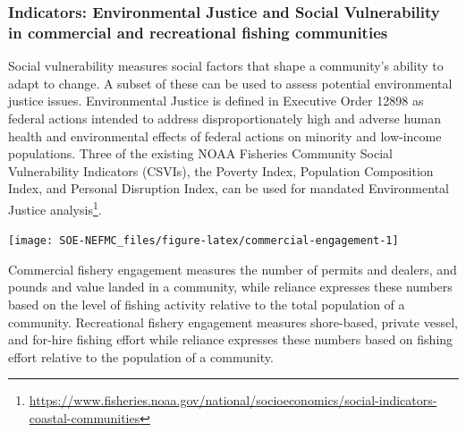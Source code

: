 \documentclass[
  10pt,
]{article}
\let\origfigure\figure
\let\endorigfigure\endfigure
\renewenvironment{figure}[1][2] {
    \expandafter\origfigure\expandafter[H]
} {
    \endorigfigure
}
\begin{document}
\hypertarget{indicators-environmental-justice-and-social-vulnerability-in-commercial-and-recreational-fishing-communities}{%
\subsubsection{Indicators: Environmental Justice and Social Vulnerability in commercial and recreational fishing communities}\label{indicators-environmental-justice-and-social-vulnerability-in-commercial-and-recreational-fishing-communities}}

Social vulnerability measures social factors that shape a community's ability to adapt to change. A subset of these can be used to assess potential environmental justice issues. Environmental Justice is defined in Executive Order 12898 as federal actions intended to address disproportionately high and adverse human health and environmental effects of federal actions on minority and low-income populations. Three of the existing NOAA Fisheries Community Social Vulnerability Indicators (CSVIs), the Poverty Index, Population Composition Index, and Personal Disruption Index, can be used for mandated Environmental Justice analysis\footnote{\url{https://www.fisheries.noaa.gov/national/socioeconomics/social-indicators-coastal-communities}}.

\begin{figure}

{\centering \texttt{[image: SOE-NEFMC\_files/figure-latex/commercial-engagement-1]} 

}

\caption{Commercial engagement, reliance, and environmental justice vulnerability for the top commercially engaged and reliant fishing communities in New England.  Communities ranked medium-high or above for one or more of the environmental justice indicators are highlighted in orange. *Community scored high (1.00 and above) for both commercial engagement and reliance indicators.}\label{fig:commercial-engagement}
\end{figure}

Commercial fishery engagement measures the number of permits and dealers, and pounds and value landed in a community, while reliance expresses these numbers based on the level of fishing activity relative to the total population of a community. Recreational fishery engagement measures shore-based, private vessel, and for-hire fishing effort while reliance expresses these numbers based on fishing effort relative to the population of a community.
\end{document}
